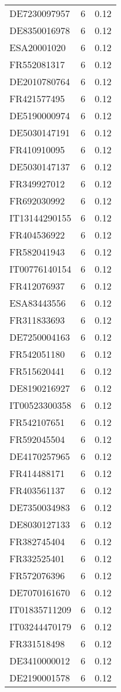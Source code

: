 \begin{table*}[htbp]
\begin{tabular}{lrr}
DE7230097957 & 6 & 0.12 \\
DE8350016978 & 6 & 0.12 \\
ESA20001020 & 6 & 0.12 \\
FR552081317 & 6 & 0.12 \\
DE2010780764 & 6 & 0.12 \\
FR421577495 & 6 & 0.12 \\
DE5190000974 & 6 & 0.12 \\
DE5030147191 & 6 & 0.12 \\
FR410910095 & 6 & 0.12 \\
DE5030147137 & 6 & 0.12 \\
FR349927012 & 6 & 0.12 \\
FR692030992 & 6 & 0.12 \\
IT13144290155 & 6 & 0.12 \\
FR404536922 & 6 & 0.12 \\
FR582041943 & 6 & 0.12 \\
IT00776140154 & 6 & 0.12 \\
FR412076937 & 6 & 0.12 \\
ESA83443556 & 6 & 0.12 \\
FR311833693 & 6 & 0.12 \\
DE7250004163 & 6 & 0.12 \\
FR542051180 & 6 & 0.12 \\
FR515620441 & 6 & 0.12 \\
DE8190216927 & 6 & 0.12 \\
IT00523300358 & 6 & 0.12 \\
FR542107651 & 6 & 0.12 \\
FR592045504 & 6 & 0.12 \\
DE4170257965 & 6 & 0.12 \\
FR414488171 & 6 & 0.12 \\
FR403561137 & 6 & 0.12 \\
DE7350034983 & 6 & 0.12 \\
DE8030127133 & 6 & 0.12 \\
FR382745404 & 6 & 0.12 \\
FR332525401 & 6 & 0.12 \\
FR572076396 & 6 & 0.12 \\
DE7070161670 & 6 & 0.12 \\
IT01835711209 & 6 & 0.12 \\
IT03244470179 & 6 & 0.12 \\
FR331518498 & 6 & 0.12 \\
DE3410000012 & 6 & 0.12 \\
DE2190001578 & 6 & 0.12 \\

\end{tabular}
\end{table*}
